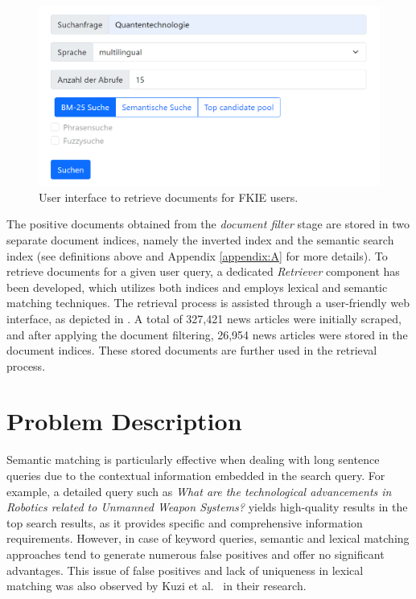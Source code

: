 \begin{figure}[h]
	\centering
	\includegraphics[width=.7\textwidth]{images/mitera_screenshots/newsfeeds_search.PNG}
	\caption[Search user interface.]{User interface to retrieve documents for FKIE users. \label{fig:mitera_search}}
\end{figure}

The positive documents obtained from the \emph{document filter} stage are stored in two separate document indices, namely the inverted index and the semantic search index (see definitions above and Appendix \ref{appendix:A} for more details). To retrieve documents for a given user query, a dedicated \emph{Retriever} component has been developed, which utilizes both indices and employs lexical and semantic matching techniques. The retrieval process is assisted through a user-friendly web interface, as depicted in . A total of 327,421 news articles were initially scraped, and after applying the document filtering, 26,954 news articles were stored in the document indices. These stored documents are further used in the retrieval process.


\section{Problem Description}

Semantic matching is particularly effective when dealing with long sentence queries due to the contextual information embedded in the search query. For example, a detailed query such as \emph{What are the technological advancements in Robotics related to Unmanned Weapon Systems?} yields high-quality results in the top search results, as it provides specific and comprehensive information requirements. However, in case of keyword queries, semantic and lexical matching approaches tend to generate numerous false positives and offer no significant advantages. This issue of false positives and lack of uniqueness in lexical matching was also observed by Kuzi et al.~\cite{kuzi2020leveraging} in their research.


